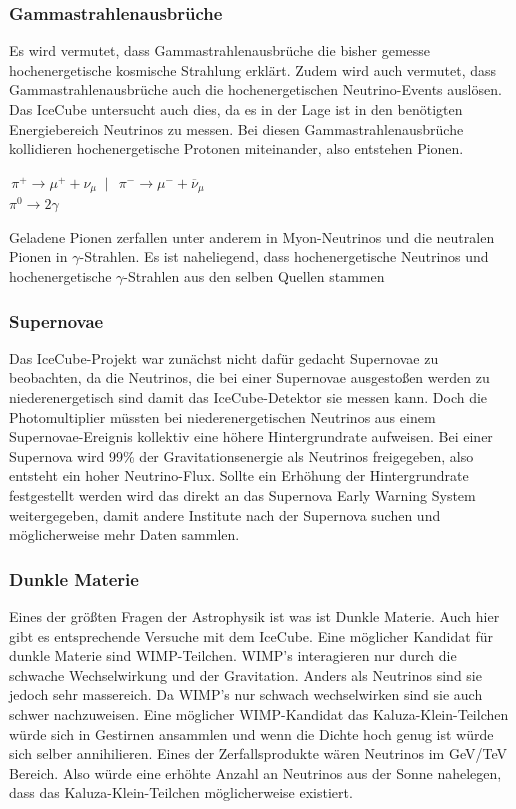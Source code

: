\subsubsection{Gammastrahlenausbrüche}

Es wird vermutet, dass Gammastrahlenausbrüche die bisher gemesse hochenergetische kosmische Strahlung erklärt. Zudem wird auch
vermutet, dass Gammastrahlenausbrüche auch die hochenergetischen Neutrino-Events auslösen.
Das IceCube untersucht auch dies, da es in der Lage ist in den benötigten Energiebereich Neutrinos zu messen.
Bei diesen Gammastrahlenausbrüche kollidieren hochenergetische Protonen miteinander, also entstehen Pionen. \cite{Abbasi2011}
\begin{center}
$\,\pi ^{+}\to \mu ^{+}+\nu _{{\mu }} \;\;|\;\; \,\pi ^{-}\to \mu ^{-}+\overline {\nu }_{{\mu }}$ \\

$\pi ^{0}\to 2\gamma $
\end{center}
Geladene Pionen zerfallen unter anderem in Myon-Neutrinos und die neutralen Pionen in $\gamma$-Strahlen. Es ist naheliegend, dass
hochenergetische Neutrinos und hochenergetische $\gamma$-Strahlen aus den selben Quellen stammen \cite{Mueller2014}

\subsubsection{Supernovae}

Das IceCube-Projekt war zunächst nicht dafür gedacht Supernovae zu beobachten, da die Neutrinos, die bei einer Supernovae ausgestoßen werden
zu niederenergetisch sind damit das IceCube-Detektor sie messen kann. Doch die Photomultiplier müssten bei niederenergetischen Neutrinos
aus einem Supernovae-Ereignis kollektiv eine höhere Hintergrundrate aufweisen. Bei einer Supernova wird 99\% der Gravitationsenergie
als Neutrinos freigegeben, also entsteht ein hoher Neutrino-Flux.
Sollte ein Erhöhung der Hintergrundrate festgestellt werden wird das direkt an das Supernova Early
Warning System weitergegeben, damit andere Institute nach der Supernova suchen und möglicherweise mehr Daten sammlen. \cite{Eberhardt2017}

\subsubsection{Dunkle Materie}

Eines der größten Fragen der Astrophysik ist was ist Dunkle Materie. Auch hier gibt es entsprechende Versuche mit dem IceCube.
Eine möglicher Kandidat für dunkle Materie sind WIMP-Teilchen. WIMP's interagieren nur durch die schwache Wechselwirkung und der Gravitation.
Anders als Neutrinos sind sie jedoch sehr massereich. \cite{Gaensler2008}
Da WIMP's nur schwach wechselwirken sind sie auch schwer nachzuweisen.
Eine möglicher WIMP-Kandidat das Kaluza-Klein-Teilchen würde sich in Gestirnen ansammlen und wenn die Dichte hoch genug ist
würde sich selber annihilieren. Eines der Zerfallsprodukte wären Neutrinos im GeV/TeV Bereich.
Also würde eine erhöhte Anzahl an Neutrinos aus der Sonne nahelegen, dass das Kaluza-Klein-Teilchen
möglicherweise existiert. \cite{Abbasi2010}

